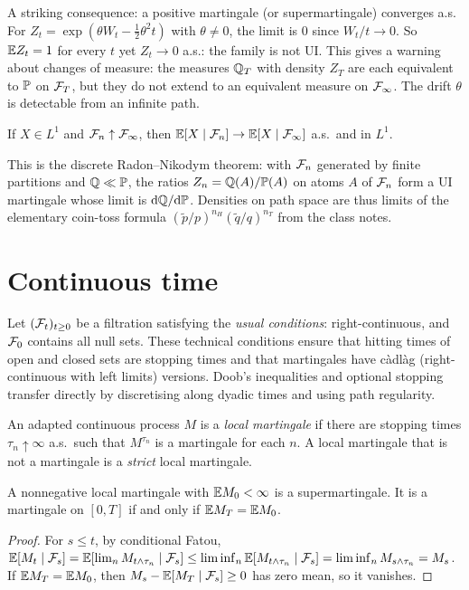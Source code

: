 A striking consequence: a positive martingale (or supermartingale) converges a.s. For $Z_t=\exp(\theta W_t-\tfrac12\theta^2t)$ with $\theta\ne0$, the limit is $0$ since $W_t/t\to0$. So $\mathbb{E} Z_t=1$ for every $t$ yet $Z_t\to0$ a.s.: the family is not UI. This gives a warning about changes of measure: the measures $\mathbb{Q}_T$ with density $Z_T$ are each equivalent to $\mathbb{P}$ on $\mathcal{F}_T$, but they do not extend to an equivalent measure on $\mathcal{F}_\infty$. The drift $\theta$ is detectable from an infinite path.

\begin{theorem}\label{thm:levy}
If $X\in L^1$ and $\mathcal{F}_n\uparrow\mathcal{F}_\infty$, then $\mathbb{E}[X\mid\mathcal{F}_n]\to\mathbb{E}[X\mid\mathcal{F}_\infty]$ a.s.\ and in $L^1$.
\end{theorem}

This is the discrete Radon--Nikodym theorem: with $\mathcal{F}_n$ generated by finite partitions and $\mathbb{Q}\ll\mathbb{P}$, the ratios $Z_n=\mathbb{Q}(A)/\mathbb{P}(A)$ on atoms $A$ of $\mathcal{F}_n$ form a UI martingale whose limit is $\mathrm{d}\mathbb{Q}/\mathrm{d}\mathbb{P}$. Densities on path space are thus limits of the elementary coin-toss formula $(\tilde p/p)^{n_H}(\tilde q/q)^{n_T}$ from the class notes.

\section{Continuous time}

Let $(\mathcal{F}_t)_{t\ge0}$ be a filtration satisfying the \emph{usual conditions}: right-continuous, and $\mathcal{F}_0$ contains all null sets. These technical conditions ensure that hitting times of open and closed sets are stopping times and that martingales have c\`adl\`ag (right-continuous with left limits) versions. Doob's inequalities and optional stopping transfer directly by discretising along dyadic times and using path regularity.

\begin{definition}\label{def:localmart}
An adapted continuous process $M$ is a \emph{local martingale} if there are stopping times $\tau_n\uparrow\infty$ a.s.\ such that $M^{\tau_n}$ is a martingale for each $n$. A local martingale that is not a martingale is a \emph{strict} local martingale.
\end{definition}

\begin{proposition}\label{prop:poslocal}
A nonnegative local martingale with $\mathbb{E} M_0<\infty$ is a supermartingale. It is a martingale on $[0,T]$ if and only if $\mathbb{E} M_T=\mathbb{E} M_0$.
\end{proposition}
\begin{proof}
For $s\le t$, by conditional Fatou,
$\mathbb{E}[M_t\mid\mathcal{F}_s]=\mathbb{E}[\lim_n M_{t\wedge\tau_n}\mid\mathcal{F}_s]\le\liminf_n\mathbb{E}[M_{t\wedge\tau_n}\mid\mathcal{F}_s]=\liminf_n M_{s\wedge\tau_n}=M_s$.
If $\mathbb{E} M_T=\mathbb{E} M_0$, then $M_s-\mathbb{E}[M_T\mid\mathcal{F}_s]\ge0$ has zero mean, so it vanishes.
\end{proof}


